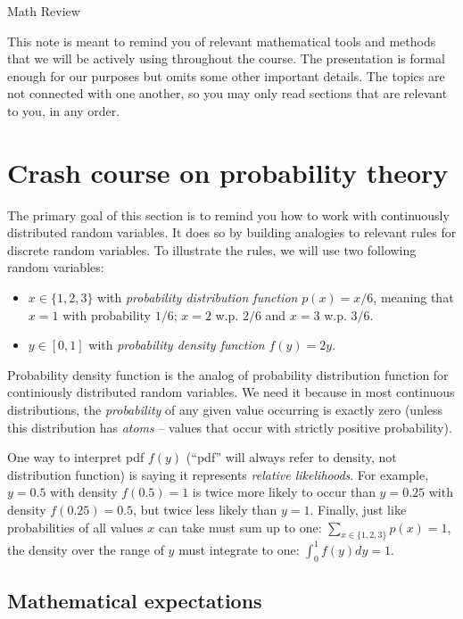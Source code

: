 \documentclass{article}
\begin{document}
\begin{center}
	{\Huge Math Review}
\end{center}
\bigskip


This note is meant to remind you of relevant mathematical tools and methods that we will be actively using throughout the course. The presentation is formal enough for our purposes but omits some other important details. The topics are not connected with one another, so you may only read sections that are relevant to you, in any order.


\section{Crash course on probability theory}

The primary goal of this section is to remind you how to work with continuously distributed random variables. It does so by building analogies to relevant rules for discrete random variables. To illustrate the rules, we will use two following random variables:
\begin{itemize}
	\item $x \in \{1,2,3\}$ with \emph{probability distribution function} $p(x) = x/6$, meaning that $x=1$ with probability $1/6$; $x=2$ w.p. $2/6$ and $x=3$ w.p. $3/6$.
	\item $y \in [0,1]$ with \emph{probability density function} $f(y)=2y$.
\end{itemize}
Probability density function is the analog of probability distribution function for continiously distributed random variables. We need it because in most continuous distributions, the \emph{probability} of any given value occurring is exactly zero (unless this distribution has \emph{atoms} -- values that occur with strictly positive probability). 

One way to interpret pdf $f(y)$ (``pdf'' will always refer to density, not distribution function) is saying it represents \emph{relative likelihoods}. For example, $y=0.5$ with density $f(0.5)=1$ is twice more likely to occur than $y=0.25$ with density $f(0.25)=0.5$, but twice less likely than $y=1$. Finally, just like probabilities of all values $x$ can take must sum up to one: $\sum_{x \in \{1,2,3\}} p(x) = 1$, the density over the range of $y$ must integrate to one: $\int_{0}^1 f(y) dy = 1$.


\subsection{Mathematical expectations}
\end{document}
